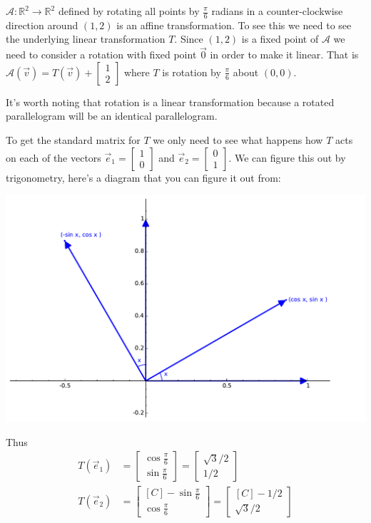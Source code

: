 \begin{example}
$\mathcal{A}:\mathbb{R}^2 \to \mathbb{R}^2$ defined by rotating all points by $\frac{\pi}{6}$ radians in a counter-clockwise direction around $(1,2)$ is an affine transformation. To see this we need to see the underlying linear transformation $T$. Since $(1,2)$ is a fixed point of $\mathcal{A}$ we need to consider a rotation with fixed point $\vec{0}$ in order to make it linear. That is $\mathcal{A}(\vec{v})=T(\vec{v})+\begin{bmatrix} 1 \\ 2 \end{bmatrix}$
where $T$ is rotation by $\frac{\pi}{6}$ about $(0,0)$.

It's worth noting that rotation is a linear transformation because a rotated parallelogram will be an identical parallelogram. 

To get the standard matrix for $T$ we only need to see what happens how $T$ acts on each of the vectors 
$\vec{e}_1=\begin{bmatrix}1 \\ 0 \end{bmatrix}$ and $\vec{e}_2=\begin{bmatrix}0 \\ 1 \end{bmatrix}$. We can figure this out by trigonometry, here's a diagram that you can figure it out from:
\begin{center}
\includegraphics[scale=.75]{Rn/rotation.pdf}
\end{center}
Thus 
\begin{align*}
T(\vec{e}_1)&=\begin{bmatrix} \cos \frac{\pi}{6} \\ \sin \frac{\pi}{6}\end{bmatrix}
=\begin{bmatrix} \sqrt{3}/2 \\ 1/2\end{bmatrix}\\
T(\vec{e}_2)&=\begin{bmatrix*}[C] -\sin \frac{\pi}{6} \\ \cos \frac{\pi}{6}\end{bmatrix*}
=\begin{bmatrix*}[C] -1/2 \\ \sqrt{3}/2\end{bmatrix*}
\end{align*}
\end{example}

